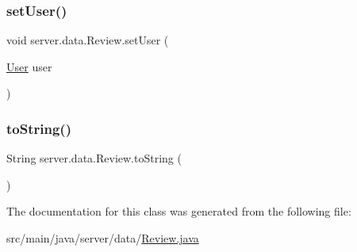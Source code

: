 \subsubsection{\texorpdfstring{set\+User()}{setUser()}}
{\footnotesize\ttfamily void server.\+data.\+Review.\+set\+User (\begin{DoxyParamCaption}\item[{\hyperlink{classserver_1_1data_1_1_user}{User}}]{user }\end{DoxyParamCaption})}

\mbox{\label{classserver_1_1data_1_1_review_a1abc364bd0ad24e6d3d3f33d55a110fc}} 
\subsubsection{\texorpdfstring{to\+String()}{toString()}}
{\footnotesize\ttfamily String server.\+data.\+Review.\+to\+String (\begin{DoxyParamCaption}{ }\end{DoxyParamCaption})}



The documentation for this class was generated from the following file\+:\begin{DoxyCompactItemize}
\item 
src/main/java/server/data/\hyperlink{_review_8java}{Review.\+java}\end{DoxyCompactItemize}
